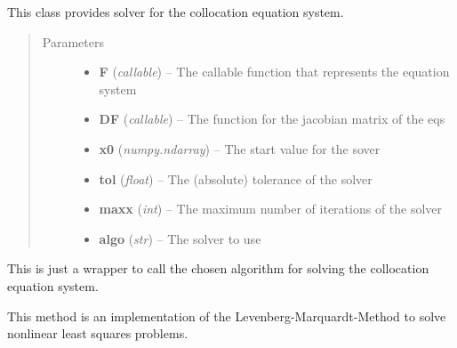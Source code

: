 \documentclass[letterpaper,10pt,english]{sphinxmanual}
\begin{document}
\begin{fulllineitems}
\label{pytrajectory:pytrajectory.solver.Solver}
This class provides solver for the collocation equation system.
\begin{quote}\begin{description}
\item[{Parameters}] \leavevmode\begin{itemize}
\item {} 
\textbf{F} (\emph{callable}) -- The callable function that represents the equation system

\item {} 
\textbf{DF} (\emph{callable}) -- The function for the jacobian matrix of the eqs

\item {} 
\textbf{x0} (\emph{numpy.ndarray}) -- The start value for the sover

\item {} 
\textbf{tol} (\emph{float}) -- The (absolute) tolerance of the solver

\item {} 
\textbf{maxx} (\emph{int}) -- The maximum number of iterations of the solver

\item {} 
\textbf{algo} (\emph{str}) -- The solver to use

\end{itemize}

\end{description}\end{quote}

\begin{fulllineitems}
\label{pytrajectory:pytrajectory.solver.Solver.solve}
This is just a wrapper to call the chosen algorithm for solving the
collocation equation system.

\end{fulllineitems}


\begin{fulllineitems}
\label{pytrajectory:pytrajectory.solver.Solver.leven}
This method is an implementation of the Levenberg-Marquardt-Method
to solve nonlinear least squares problems.


\end{fulllineitems}
\end{fulllineitems}
\end{document}
